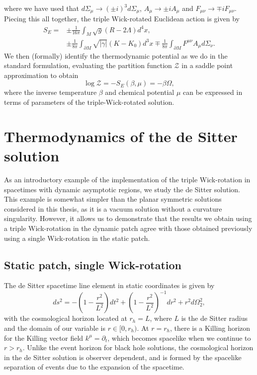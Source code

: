 where we have used that $d\Sigma_\mu \rightarrow (\pm i)^3 d\Sigma_\mu$, $A_\mu \rightarrow \pm iA_\mu$ and $F_{\mu \nu} \rightarrow \mp iF_{\mu \nu}$. Piecing this all together, the triple Wick-rotated Euclidean action is given by
\begin{equation}
\label{eq:3EucAct}
\begin{aligned}
        S_E = &\pm \frac{1}{16 \pi} \int_{M} \sqrt{g} (R - 2\Lambda) d^4 x ,
        \\& \pm \frac{1}{8\pi} \int_{\partial M} \sqrt{|\gamma|}(K-K_0) d^3x 
        \mp \frac{1}{8\pi} \int_{\partial M} F^{\mu \nu } A_\mu d\Sigma_\nu.
\end{aligned}
\end{equation}
We then (formally) identify the thermodynamic potential as we do in the standard formulation, evaluating the partition function $\mathcal{Z}$ in a saddle point approximation to obtain
\begin{equation}
\label{eq:thermalguess}
    \log \mathcal{Z} = - S_E(\beta, \mu) = - \beta \Omega,
\end{equation} 
where the inverse temperature $\beta$ and chemical potential $\mu$ can be expressed in terms of parameters of the triple-Wick-rotated solution. 

\section{Thermodynamics of the de Sitter solution}
\label{sec:desitter}

As an introductory example of the implementation of the triple Wick-rotation in spacetimes with dynamic asymptotic regions, we study the de Sitter solution. This example is somewhat simpler than the planar symmetric solutions considered in this thesis, as it is a vacuum solution without a curvature singularity.  However, it allows us to demonstrate that the results we obtain using a triple Wick-rotation in the dynamic patch agree with those obtained previously using a single Wick-rotation in the static patch. 

\subsection{Static patch, single Wick-rotation}
The de Sitter spacetime line element in static coordinates is given by
\begin{equation}
\label{eq:desitterline}
    ds^2 = -\left(1 - \frac{r^2}{L^2} \right) dt^2 + \left(1 - \frac{r^2}{L^2} \right)^{-1} dr^2 + r^2 d\Omega^2_2,
\end{equation}
with the cosmological horizon located at $r_h = L$, where $L$ is the de Sitter radius and the domain of our variable is $r \in [0,r_h)$. At $r=r_h$, there is a Killing horizon for the Killing vector field
$k^\mu = \partial_t$, which becomes spacelike when we continue to $r>r_h$. Unlike the event horizon for black hole solutions, the cosmological horizon in the de Sitter solution is observer dependent, and is formed by the spacelike separation of events due to the expansion of the spacetime. 

